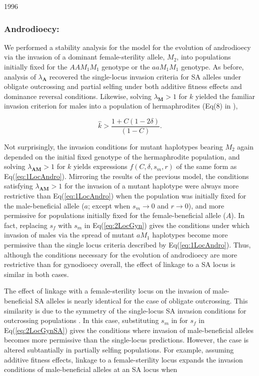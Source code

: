 1996\documentclass[9pt,twocolumn,twoside,lineno]{gsajnl}
\begin{document}
\subsubsection{Androdioecy:} We performed a stability analysis for the model for the evolution of androdioecy via the invasion of a dominant female-sterility allele, $M_2$, into populations initially fixed for the $AAM_1M_1$ genotype or the $aaM_1M_1$ genotype. As before, analysis of $\lambda_{\mathbf{A}}$ recovered the single-locus invasion criteria for SA alleles under obligate outcrossing and partial selfing under both additive fitness effects and dominance reversal conditions. Likewise, solving $\lambda_{\mathbf{M}} > 1$ for $k$ yielded the familiar invasion criterion for males into a population of hermaphrodites (Eq(8) in \citealt{Charlesworth1978a}),

\begin{equation}\label{eq:1LocAndro}
	\hat{k} > \frac{1 + C (1 - 2 \delta)}{(1 - C)}.
\end{equation}

\noindent Not surprisingly, the invasion conditions for mutant haplotypes bearing $M_2$ again depended on the initial fixed genotype of the hermaphrodite population, and solving $\lambda_{\mathbf{AM}} > 1$ for $k$ yields expressions $f(C,\delta,s_m,r)$ of the same form as Eq(\ref{eq:1LocAndro}). Mirroring the results of the previous model, the conditions satisfying $\lambda_{\mathbf{AM}} > 1$ for the invasion of a mutant haplotype were always more restrictive than Eq(\ref{eq:1LocAndro}) when the population was initially fixed for the male-beneficial allele ($a$; except when $s_m \rightarrow 0$ and $r \rightarrow 0$), and more permissive for populations initially fixed for the female-beneficial allele ($A$). In fact, replacing $s_f$ with $s_m$ in Eq(\ref{eq:2LocGyn}) gives the conditions under which invasion of males via the spread of mutant $aM_1$ haplotypes become more permissive than the single locus criteria described by Eq(\ref{eq:1LocAndro}). Thus, although the conditions necessary for the evolution of androdioecy are more restrictive than for gynodioecy overall, the effect of linkage to a SA locus is similar in both cases. 

The effect of linkage with a female-sterility locus on the invasion of male-beneficial SA alleles is nearly identical for the case of obligate outcrossing. This similarity is due to the symmetry of the single-locus SA invasion conditions for outcrossing populations \citep{Kidwell1977}. In this case, substituting $s_m$ in for $s_f$ in Eq(\ref{eq:2LocGynSA}) gives the conditions where invasion of male-beneficial alleles becomes more permissive than the single-locus predictions. However, the case is altered subtantially in partially selfing populations. For example, assuming additive fitness effects, linkage to a female-sterility locus expands the invasion conditions of male-beneficial alleles at an SA locus when
\end{document}
